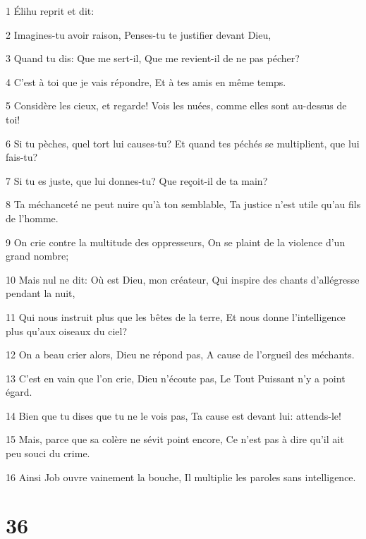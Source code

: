 \par 1 Élihu reprit et dit:
\par 2 Imagines-tu avoir raison, Penses-tu te justifier devant Dieu,
\par 3 Quand tu dis: Que me sert-il, Que me revient-il de ne pas pécher?
\par 4 C'est à toi que je vais répondre, Et à tes amis en même temps.
\par 5 Considère les cieux, et regarde! Vois les nuées, comme elles sont au-dessus de toi!
\par 6 Si tu pèches, quel tort lui causes-tu? Et quand tes péchés se multiplient, que lui fais-tu?
\par 7 Si tu es juste, que lui donnes-tu? Que reçoit-il de ta main?
\par 8 Ta méchanceté ne peut nuire qu'à ton semblable, Ta justice n'est utile qu'au fils de l'homme.
\par 9 On crie contre la multitude des oppresseurs, On se plaint de la violence d'un grand nombre;
\par 10 Mais nul ne dit: Où est Dieu, mon créateur, Qui inspire des chants d'allégresse pendant la nuit,
\par 11 Qui nous instruit plus que les bêtes de la terre, Et nous donne l'intelligence plus qu'aux oiseaux du ciel?
\par 12 On a beau crier alors, Dieu ne répond pas, A cause de l'orgueil des méchants.
\par 13 C'est en vain que l'on crie, Dieu n'écoute pas, Le Tout Puissant n'y a point égard.
\par 14 Bien que tu dises que tu ne le vois pas, Ta cause est devant lui: attends-le!
\par 15 Mais, parce que sa colère ne sévit point encore, Ce n'est pas à dire qu'il ait peu souci du crime.
\par 16 Ainsi Job ouvre vainement la bouche, Il multiplie les paroles sans intelligence.

\chapter{36}

